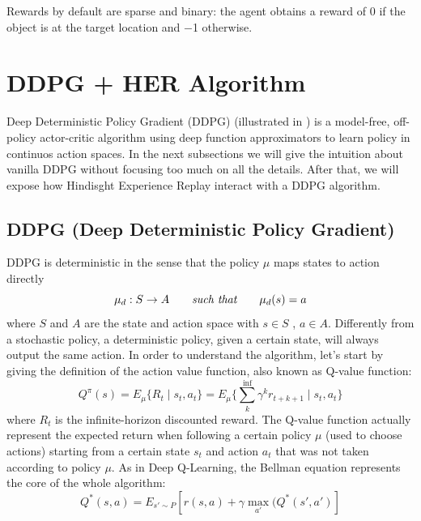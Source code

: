 \documentclass[a4paper]{report}
\begin{document}
Rewards by default are sparse and binary: the agent obtains a reward of 0 if the object is at the target location and −1 otherwise. 
\chapter{DDPG + HER Algorithm \label{ddpgalgo}}
Deep Deterministic Policy Gradient (DDPG) (illustrated in \cite{ddpg}) is a model-free, off-policy actor-critic algorithm using deep function approximators to learn policy in continuos action spaces. In the next subsections we will give the intuition about vanilla DDPG without focusing too much on all the details. After that, we will expose how Hindisght Experience Replay interact with a DDPG algorithm.
\section{DDPG (Deep Deterministic Policy Gradient)}
DDPG is deterministic in the sense that the policy $\mu $ maps states to action directly
\begin{equation}
\mu_d : S \rightarrow A \qquad \emph{such that} \qquad \mu_d(s) = a
\end{equation}
where $ S $ and $ A $ are the state and action space with $ s \in S$ , $a \in A$. Differently from a stochastic policy,  a deterministic policy, given a certain state, will always output the same action.
In order to understand  the algorithm, let's start by giving the definition of the action value function, also known as Q-value function:
\begin{equation}
Q^{\pi}(s) = E_{\mu} \{R_t \mid s_t, a_t  \} =  E_{\mu} \{\sum_{k}^{\inf} \gamma^k r_{t+k+1} \mid s_t, a_t  \}
\end{equation}
where $R_t$ is the infinite-horizon discounted reward. The Q-value function actually represent the expected return when following a certain policy $\mu$ (used to choose actions) starting from a certain state $s_t$ and action $a_t$ that was not taken according to policy $\mu$.
As in Deep Q-Learning, the Bellman equation represents the core of the whole algorithm:
\begin{equation} \label{bellman eq}
Q^*(s,a)=E_{s'\sim P} [r(s,a) + \gamma \max_{a'}(Q^*(s',a')]
\end{equation} 
\end{document}
